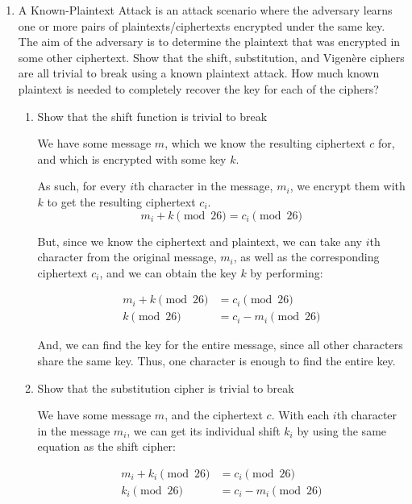 \documentclass{article}
\begin{document}
\begin{enumerate}
  \item A Known-Plaintext Attack is an attack scenario where the adversary 
    learns one or more pairs of plaintexts/ciphertexts encrypted under the same
    key. The aim of the adversary is to determine the plaintext that was 
    encrypted in some other ciphertext. Show that the shift, substitution, and 
    Vigen\`ere ciphers are all trivial to break using a known plaintext attack. 
    How much known plaintext is needed to completely recover the key for each
    of the ciphers?\\

    \begin{enumerate}
      \item Show that the shift function is trivial to break

        We have some message $m$, which we know the resulting ciphertext $c$
        for, and which is encrypted with some key $k$.

        As such, for every $i$th character in the message, $m_i$, we encrypt 
        them with $k$ to get the resulting ciphertext $c_i$.
        \[
          m_i + k \pmod{26} = c_i \pmod{26}
        \]

        But, since we know the ciphertext and plaintext, we can take any $i$th
        character from the original message, $m_i$, as well as the
        corresponding ciphertext $c_i$, and we can obtain the key $k$ by
        performing:

        \begin{align*}
          m_i + k \pmod{26} &= c_i \pmod{26}\\
          k \pmod{26} &= c_i - m_i \pmod{26}
        \end{align*}

        And, we can find the key for the entire message, since all other 
        characters share the same key. Thus, one character is enough to find 
        the entire key.
      \item Show that the substitution cipher is trivial to break

        We have some message $m$, and the ciphertext $c$. With each $i$th
        character in the message $m_i$, we can get its individual shift $k_i$ by
        using the same equation as the shift cipher:

        \begin{align*}
          m_i + k_i \pmod{26} &= c_i \pmod{26}\\
          k_i \pmod{26} &= c_i - m_i \pmod{26}
        \end{align*}


\end{enumerate}
\end{enumerate}
\end{document}
